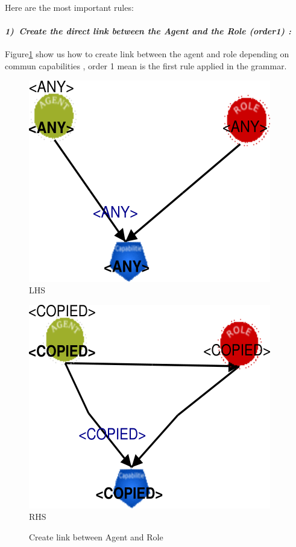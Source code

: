   
\pagebreak

Here are the most important rules:  

\paragraph{\emph{1)~Create the direct link  between the Agent and the Role (order1) :} }
 
Figure\ref{fig:Create link between Agent and Role} show us how to create link 
between the agent and role depending on commun capabilities , order 1 mean is the first rule applied in the grammar. 
\vspace{1cm}
\begin{figure}[th]
\centering
\begin{minipage}{.5\textwidth}
  \begin{center}
  \includegraphics[width=.8\linewidth]{chapiter3/img/L1}
  LHS
  \end{center}
  
\end{minipage}%
\begin{minipage}{.5\textwidth}
  \begin{center}
  \includegraphics[width=.8\linewidth]{chapiter3/img/R1}
  RHS 
  \end{center}
\end{minipage}
\caption{\label{fig:Create link between Agent and Role}Create link between Agent and Role} 
\end{figure}
 

